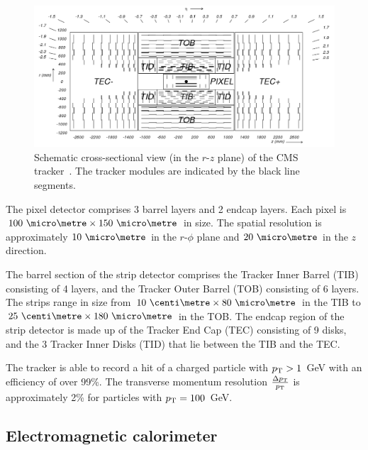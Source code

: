 \begin{figure}
	\begin{center}
		\includegraphics[width=0.8\linewidth]{figs/detector/tracker}
	\end{center}
	\caption{Schematic cross-sectional view (in the $r$-$z$ plane) of the CMS 
		tracker~\cite{cms}. The tracker modules are indicated by the black line 
		segments.}
	\label{fig:tracker}
\end{figure}

The pixel detector comprises 3 barrel layers and 2 endcap layers. Each pixel is 
$100~\micro\metre\times150~\micro\metre$ in size. The spatial 
resolution is approximately $10~\micro\metre$ in the {$r$-$\phi$} plane and 
$20~\micro\metre$ in the $z$ direction.

The barrel section of the strip detector comprises the Tracker Inner Barrel 
(TIB) consisting of 4 layers, and the Tracker Outer Barrel (TOB) consisting of 
6 layers. The strips range in size from $10~\centi\metre\times80~\micro\metre$ 
in the TIB to $25~\centi\metre\times180~\micro\metre$ in the TOB. The endcap 
region of the strip detector is made up of the Tracker End Cap (TEC) consisting 
of 9 disks, and the 3 Tracker Inner Disks (TID) that lie between the TIB and 
the TEC.

The tracker is able to record a hit of a charged particle with ${p_{\text T}}>1$~GeV with 
an efficiency of over 99\%. The transverse momentum resolution 
$\frac{\Delta{p_{\text T}}}{{p_{\text T}}}$ is approximately 2\% for particles with ${p_{\text T}} = 100$~GeV.

\subsection{Electromagnetic calorimeter}

